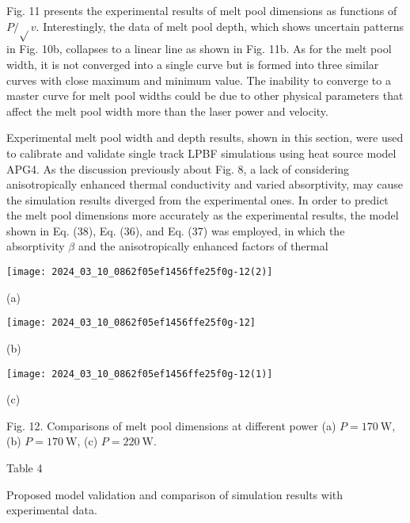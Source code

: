 \documentclass[10pt]{article}
\begin{document}
Fig. 11 presents the experimental results of melt pool dimensions as functions of $P / \sqrt{ } v$. Interestingly, the data of melt pool depth, which shows uncertain patterns in Fig. 10b, collapses to a linear line as shown in Fig. 11b. As for the melt pool width, it is not converged into a single curve but is formed into three similar curves with close maximum and minimum value. The inability to converge to a master curve for melt pool widths could be due to other physical parameters that affect the melt pool width more than the laser power and velocity.

Experimental melt pool width and depth results, shown in this section, were used to calibrate and validate single track LPBF simulations using heat source model APG4. As the discussion previously about Fig. 8, a lack of considering anisotropically enhanced thermal conductivity and varied absorptivity, may cause the simulation results diverged from the experimental ones. In order to predict the melt pool dimensions more accurately as the experimental results, the model shown in Eq. (38), Eq. (36), and Eq. (37) was employed, in which the absorptivity $\beta$ and the anisotropically enhanced factors of thermal

\begin{center}
\texttt{[image: 2024\_03\_10\_0862f05ef1456ffe25f0g-12(2)]}
\end{center}

(a)

\begin{center}
\texttt{[image: 2024\_03\_10\_0862f05ef1456ffe25f0g-12]}
\end{center}

(b)

\begin{center}
\texttt{[image: 2024\_03\_10\_0862f05ef1456ffe25f0g-12(1)]}
\end{center}

(c)

Fig. 12. Comparisons of melt pool dimensions at different power (a) $P=170 \mathrm{~W}$, (b) $P=170 \mathrm{~W}$, (c) $P=220 \mathrm{~W}$.

Table 4

Proposed model validation and comparison of simulation results with experimental data.
\end{document}
